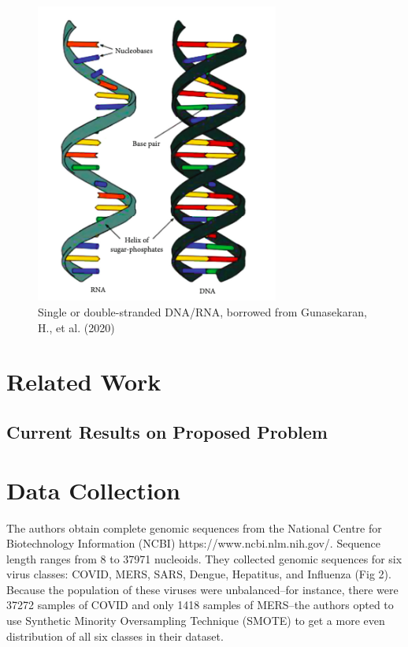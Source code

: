 \documentclass[journal]{IEEEtran}
\begin{document}
\begin{figure}
  \centering
  \includegraphics[width=8cm]{figures/dna.png}
  \caption{Single or double-stranded DNA/RNA, borrowed from Gunasekaran, H., et al. (2020)}
\end{figure}

\section{Related Work}

\subsection{Current Results on Proposed Problem}

\section{Data Collection}
The authors obtain complete genomic sequences from the 
National Centre for Biotechnology Information (NCBI) https://www.ncbi.nlm.nih.gov/.
Sequence length ranges from 8 to 37971 nucleoids. They collected genomic sequences
for six virus classes: COVID, MERS, SARS, Dengue, Hepatitus, and Influenza (Fig 2).
Because the population of these viruses were unbalanced--for instance, there were 37272
samples of COVID and only 1418 samples of MERS--the authors opted to use
Synthetic Minority Oversampling Technique (SMOTE) to get a more even distribution of
all six classes in their dataset.
\end{document}
